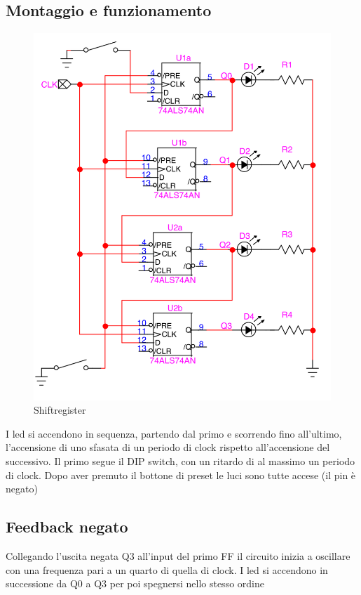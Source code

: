 \documentclass[10pt,a4paper]{article}
\begin{document}
\subsection{Montaggio e funzionamento}
\begin{figure}[h]
	\includegraphics[scale=1]{circuito3.png}
	\caption{Shiftregister}                                  \end{figure}
I led si accendono in sequenza, partendo dal primo e scorrendo fino all'ultimo, l'accensione di uno sfasata di un periodo di clock rispetto all'accensione del successivo. Il primo segue il DIP switch, con un ritardo di al massimo un periodo di clock. Dopo aver premuto il bottone di preset le luci sono tutte accese (il pin è negato)

\subsection{Feedback negato}
Collegando l'uscita negata Q3 all'input del primo FF il circuito inizia a oscillare con una frequenza pari a un quarto di quella di clock. I led si accendono in successione da Q0 a Q3 per poi spegnersi nello stesso ordine
\end{document}
